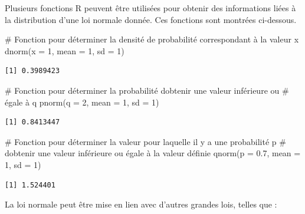 \documentclass[
  letterpaper,
]{book}
\newenvironment{Shaded}{\begin{snugshade}}{\end{snugshade}}
\newcommand{\AttributeTok}[1]{\textcolor[rgb]{0.40,0.45,0.13}{#1}}
\newcommand{\CommentTok}[1]{\textcolor[rgb]{0.37,0.37,0.37}{#1}}
\newcommand{\DecValTok}[1]{\textcolor[rgb]{0.68,0.00,0.00}{#1}}
\newcommand{\FloatTok}[1]{\textcolor[rgb]{0.68,0.00,0.00}{#1}}
\newcommand{\FunctionTok}[1]{\textcolor[rgb]{0.28,0.35,0.67}{#1}}
\newcommand{\NormalTok}[1]{\textcolor[rgb]{0.00,0.23,0.31}{#1}}
\begin{document}
Plusieurs fonctions R peuvent être utilisées pour obtenir des
informations liées à la distribution d'une loi normale donnée. Ces
fonctions sont montrées ci-dessous.

\begin{Shaded}
\begin{Highlighting}[]
\CommentTok{\# Fonction pour déterminer la densité de probabilité correspondant à la valeur x}
\FunctionTok{dnorm}\NormalTok{(}\AttributeTok{x =} \DecValTok{1}\NormalTok{, }\AttributeTok{mean =} \DecValTok{1}\NormalTok{, }\AttributeTok{sd =} \DecValTok{1}\NormalTok{)}
\end{Highlighting}
\end{Shaded}

\begin{verbatim}
[1] 0.3989423
\end{verbatim}

\begin{Shaded}
\begin{Highlighting}[]
\CommentTok{\# Fonction pour déterminer la probabilité d\textquotesingle{}obtenir une valeur inférieure ou }
\CommentTok{\# égale à q}
\FunctionTok{pnorm}\NormalTok{(}\AttributeTok{q =} \DecValTok{2}\NormalTok{, }\AttributeTok{mean =} \DecValTok{1}\NormalTok{, }\AttributeTok{sd =} \DecValTok{1}\NormalTok{)}
\end{Highlighting}
\end{Shaded}

\begin{verbatim}
[1] 0.8413447
\end{verbatim}

\begin{Shaded}
\begin{Highlighting}[]
\CommentTok{\# Fonction pour déterminer la valeur pour laquelle il y a une probabilité p }
\CommentTok{\# d\textquotesingle{}obtenir une valeur inférieure ou égale à la valeur définie}
\FunctionTok{qnorm}\NormalTok{(}\AttributeTok{p =} \FloatTok{0.7}\NormalTok{, }\AttributeTok{mean =} \DecValTok{1}\NormalTok{, }\AttributeTok{sd =} \DecValTok{1}\NormalTok{)}
\end{Highlighting}
\end{Shaded}

\begin{verbatim}
[1] 1.524401
\end{verbatim}

La loi normale peut être mise en lien avec d'autres grandes lois, telles
que :
\end{document}
